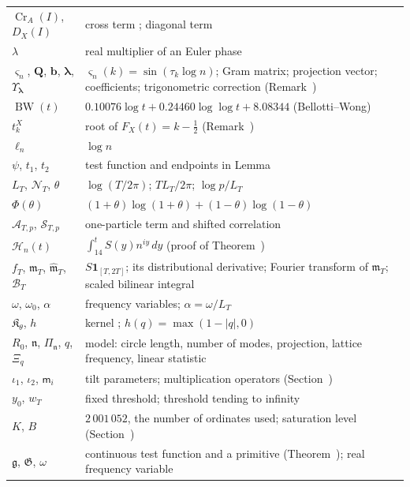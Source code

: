\documentclass[preprint,12pt]{elsarticle}
\makeatletter
\let\CG@origref\ref
\let\CG@origeqref\eqref
\newcommand{\CG@gettip}[1]{\@ifundefined{CGTip@#1}{Reference: #1}{\csname CGTip@#1\endcsname}}
\DeclareRobustCommand{\CGref}[1]{\pdftooltip{\CG@origref{#1}}{\CG@gettip{#1}}}
\DeclareRobustCommand{\CGeqref}[1]{\pdftooltip{\CG@origeqref{#1}}{\CG@gettip{#1}}}
\numberwithin{equation}{section}
\theoremstyle{plain}
\theoremstyle{definition}
\theoremstyle{remark}
\newcommand{\Cr}{\operatorname{Cr}}
\newcommand{\BW}{\operatorname{BW}}
\makeatother
\begin{document}
\begin{center}
\begin{longtable}{p{}p{}}
$\Cr_A(I)$, $D_X(I)$ & cross term \CGeqref{eq:Cr_def}; diagonal term \CGeqref{eq:full_factor_gain}\\
$\lambda$ & real multiplier of an Euler phase\\
$\varsigma_n$, $\mathbf Q$, $\mathbf b$, $\boldsymbol\lambda$, $\Upsilon_{\boldsymbol\lambda}$ & $\varsigma_n(k)=\sin(\tau_k\log n)$; Gram matrix; projection vector; coefficients; trigonometric correction (Remark~\CGref{rem:matrix_projection})\\
$\BW(t)$ & $0.10076\log t+0.24460\log\log t+8.08344$ (Bellotti--Wong)\\
$t_k^X$ & root of $F_X(t)=k-\frac12$ (Remark~\CGref{rem:localization})\\
$\ell_n$ & $\log n$\\
$\psi$, $t_1$, $t_2$ & test function and endpoints in Lemma~\CGref{lem:first_moment_identity}\\
$L_T$, $\mathcal N_T$, $\theta$ & $\log(T/2\pi)$; $TL_T/2\pi$; $\log p/L_T$\\
$\Phi(\theta)$ & $(1+\theta)\log(1+\theta)+(1-\theta)\log(1-\theta)$\\
$\mathcal A_{T,p}$, $\mathcal S_{T,p}$ & one-particle term and shifted correlation \CGeqref{eq:ATp_STp}\\
$\mathcal H_n(t)$ & $\int_{14}^tS(y)n^{iy}\,dy$ (proof of Theorem~\CGref{thm:projection})\\
$f_T$, $\mathfrak m_T$, $\widehat{\mathfrak m}_T$, $\mathcal B_T$ & $S\mathbf 1_{[T,2T]}$; its distributional derivative; Fourier transform of $\mathfrak m_T$; scaled bilinear integral \CGeqref{eq:BT_scaled}\\
$\omega$, $\omega_0$, $\alpha$ & frequency variables; $\alpha=\omega/L_T$\\
$\mathfrak K_\theta$, $h$ & kernel \CGeqref{eq:kernel_piecewise}; $h(q)=\max(1-|q|,0)$\\
$R_0$, $\mathfrak n$, $\Pi_{\mathfrak n}$, $q$, $\Xi_q$ & model: circle length, number of modes, projection, lattice frequency, linear statistic\\
$\iota_1$, $\iota_2$, $\mathsf m_i$ & tilt parameters; multiplication operators (Section~\CGref{subsec:det_model})\\
$y_0$, $w_T$ & fixed threshold; threshold tending to infinity\\
$K$, $B$ & $2\,001\,052$, the number of ordinates used; saturation level (Section~\CGref{subsec:one_step_cutoff})\\
$\mathfrak g$, $\mathfrak G$, $\omega$ & continuous test function and a primitive (Theorem~\CGref{thm:identity_g}); real frequency variable\\

\end{longtable}
\end{center}
\end{document}
